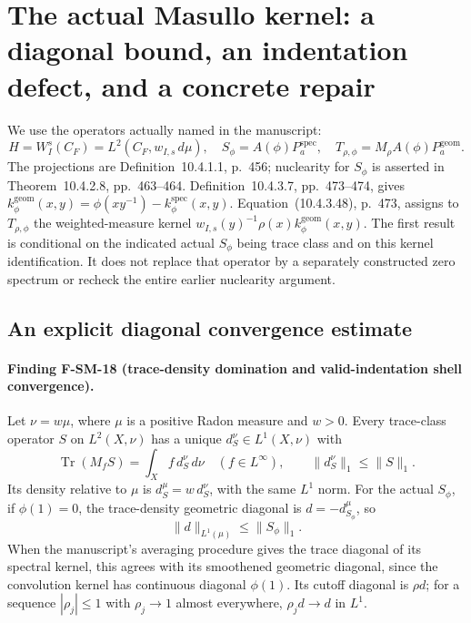 \documentclass[11pt,a4paper]{article}
\theoremstyle{definition}\newtheorem{definition}[theorem]{Definition}
\theoremstyle{remark}\newtheorem{remark}[theorem]{Remark}
\begin{document}

\section{The actual Masullo kernel: a diagonal bound, an indentation defect, and a concrete repair}
\label{sec:SM-actual-kernel}

We use the operators actually named in the manuscript:
\[
 H=W_I^s(C_F)=L^2(C_F,w_{I,s}\,d\mu),\quad
 S_\phi=A(\phi)P_a^{\mathrm{spec}},\quad
 T_{\rho,\phi}=M_\rho A(\phi)P_a^{\mathrm{geom}}.
\]
The projections are Definition~10.4.1.1, p.~456; nuclearity for
$S_\phi$ is asserted in Theorem~10.4.2.8, pp.~463--464.
Definition~10.4.3.7, pp.~473--474, gives
$k^{\mathrm{geom}}_\phi(x,y)=\phi(xy^{-1})-k^{\mathrm{spec}}_\phi(x,y)$.
Equation~(10.4.3.48), p.~473, assigns to $T_{\rho,\phi}$ the
weighted-measure kernel
$w_{I,s}(y)^{-1}\rho(x)k^{\mathrm{geom}}_\phi(x,y)$.
The first result is conditional on the indicated actual $S_\phi$
being trace class and on this kernel identification.  It does not
replace that operator by a separately constructed zero spectrum or
recheck the entire earlier nuclearity argument.

\subsection{An explicit diagonal convergence estimate}

\paragraph{Finding F-SM-18 (trace-density domination and valid-indentation shell convergence).}
Let $\nu=w\mu$, where $\mu$ is a positive Radon measure and $w>0$.
Every trace-class operator $S$ on $L^2(X,\nu)$ has a unique
$d_S^\nu\in L^1(X,\nu)$ with
\[
 \operatorname{Tr}(M_fS)=\int_X f\,d_S^\nu\,d\nu
 \quad(f\in L^\infty),\qquad \|d_S^\nu\|_1\leq\|S\|_1.
 \tag{SM.18.1}
\]
Its density relative to $\mu$ is $d_S^\mu=w\,d_S^\nu$, with
the same $L^1$ norm.  For the actual $S_\phi$, if $\phi(1)=0$,
the trace-density geometric diagonal is $d=-d_{S_\phi}^\mu$, so
\[
 \|d\|_{L^1(\mu)}\leq\|S_\phi\|_1.
 \tag{SM.18.2}
\]
When the manuscript's averaging procedure gives the trace
diagonal of its spectral kernel, this agrees with its smoothened
geometric diagonal, since the convolution kernel has continuous
diagonal $\phi(1)$.  Its cutoff diagonal is $\rho d$;
for a sequence $|\rho_j|\leq1$ with $\rho_j\to1$ almost
everywhere, $\rho_jd\to d$ in $L^1$.
\end{document}
